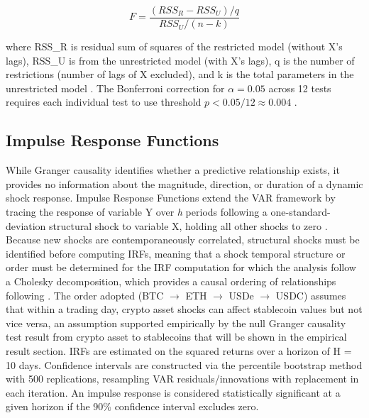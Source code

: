 \documentclass[12pt,a4paper,titlepage,oneside,english]{article}
\begin{document}
$$F = \frac{(RSS_R - RSS_U)/q}{RSS_U/(n-k)}$$

where RSS\_R is residual sum of squares of the restricted model (without X's lags), RSS\_U is from the unrestricted model (with X's lags), q is the number of restrictions (number of lags of X excluded), and k is the total parameters in the unrestricted model \parencite{MultipleTSA}.
The Bonferroni correction for $\alpha = 0.05$ across 12 tests requires each individual test to use threshold $p<0.05/12 \approx 0.004$ \parencite{Dunn01031961}.

\subsection{Impulse Response Functions}
While Granger causality identifies whether a predictive relationship exists, it provides no information about the magnitude, direction, or duration of a dynamic shock response. Impulse Response Functions extend the VAR framework by tracing the response of variable Y over \textit{h} periods following a one-standard-deviation structural shock to variable X, holding all other shocks to zero \parencite{CHOI201971}. Because new shocks are contemporaneously correlated, structural shocks must be identified before computing IRFs, meaning that a shock temporal structure or order must be determined for the IRF computation for which the analysis follow a Cholesky decomposition, which provides a causal ordering of relationships following \parencite{sims1980macroeconomics}. The order adopted (BTC $\rightarrow$ ETH $\rightarrow$ USDe $\rightarrow$ USDC) assumes that within a trading day, crypto asset shocks can affect stablecoin values but not vice versa, an assumption supported empirically by the null Granger causality test result from crypto asset to stablecoins that will be shown in the empirical result section. IRFs are estimated on the squared returns over a horizon of H = 10 days. Confidence intervals are constructed via the percentile bootstrap method with 500 replications, resampling VAR residuals/innovations with replacement in each iteration. An impulse response is considered statistically significant at a given horizon if the 90\% confidence interval excludes zero. \parencite{10.1162/003465398557465}
\end{document}
